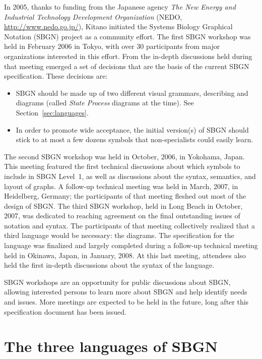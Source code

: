 In 2005, thanks to funding from the Japanese agency \emph{The New Energy and Industrial Technology Development Organization} (NEDO, \url{http://www.nedo.go.jp/}), Kitano initiated the Systems Biology Graphical Notation (SBGN) project as a community effort.  The first SBGN workshop was held in February 2006 in Tokyo, with over 30 participants from major organizations interested in this effort.  From the in-depth discussions held during that meeting emerged a set of decisions that are the basis of the current SBGN specification.  These decisions are:

\begin{itemize}

\item SBGN should be made up of two different visual grammars, describing \ER{} and \PD{} diagrams (called \emph{State Process} diagrams at the time).  See Section~\vref{sec:languages}.

\item In order to promote wide acceptance, the initial version(s) of SBGN should stick to at most a few dozens symbols that non-specialists could easily learn.

\end{itemize}

The second SBGN workshop was held in October, 2006, in Yokohama, Japan.  This meeting featured the first technical discussions about which symbols to include in SBGN Level~1, as well as discussions about the syntax, semantics, and layout of graphs.  A follow-up technical meeting was held in March, 2007, in Heidelberg, Germany; the participants of that meeting fleshed out most of the design of SBGN.  The third SBGN workshop, held in Long Beach in October, 2007, was dedicated to reaching agreement on the final outstanding issues of notation and syntax.  The participants of that meeting collectively realized that a third language would be necessary: the \AF diagrams.  The specification for the \PD language was finalized and largely completed during a follow-up technical meeting held in Okinawa, Japan, in January, 2008.  At this last meeting, attendees also held the first in-depth discussions about the syntax of the \ER language.

SBGN workshops are an opportunity for public discussions about SBGN, allowing interested persons to learn more about SBGN and help identify needs and issues.  More meetings are expected to be held in the future, long after this specification document has been issued.


\section{The three languages of SBGN}
\label{sec:languages}


